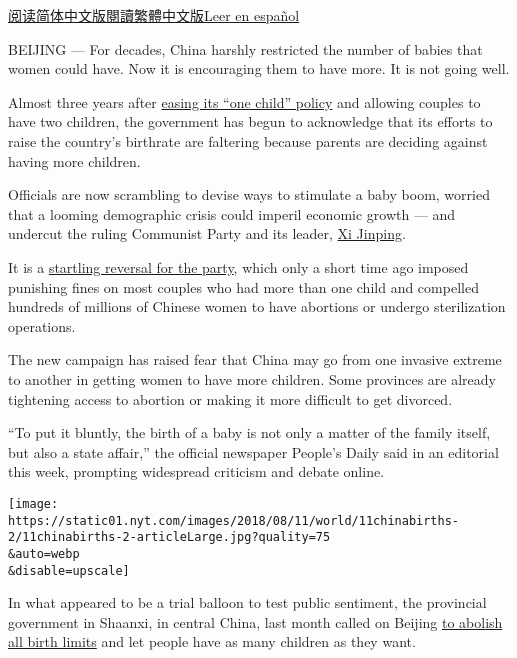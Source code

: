 \href{https://cn.nytimes.com/china/20180813/china-one-child-policy-birthrate/}{阅读简体中文版}\href{https://cn.nytimes.com/china/20180813/china-one-child-policy-birthrate/zh-hant/}{閱讀繁體中文版}\href{https://www.nytimes.com/es/2018/08/16/china-poblacion-hijo-unico/}{Leer
en español}

BEIJING --- For decades, China harshly restricted the number of babies
that women could have. Now it is encouraging them to have more. It is
not going well.

Almost three years after
\href{https://www.nytimes.com/2015/10/30/world/asia/china-end-one-child-policy.html}{easing
its ``one child'' policy} and allowing couples to have two children, the
government has begun to acknowledge that its efforts to raise the
country's birthrate are faltering because parents are deciding against
having more children.

Officials are now scrambling to devise ways to stimulate a baby boom,
worried that a looming demographic crisis could imperil economic growth
--- and undercut the ruling Communist Party and its leader,
\href{https://www.nytimes.com/2018/07/31/world/asia/xi-jinping-internal-dissent.html}{Xi
Jinping}.

It is a
\href{https://www.nytimes.com/interactive/2015/10/29/world/asia/china-one-child-policy-timeline.html}{startling
reversal for the party}, which only a short time ago imposed punishing
fines on most couples who had more than one child and compelled hundreds
of millions of Chinese women to have abortions or undergo sterilization
operations.

The new campaign has raised fear that China may go from one invasive
extreme to another in getting women to have more children. Some
provinces are already tightening access to abortion or making it more
difficult to get divorced.

``To put it bluntly, the birth of a baby is not only a matter of the
family itself, but also a state affair,'' the official newspaper
People's Daily said in an editorial this week, prompting widespread
criticism and debate online.

\texttt{[image: https://static01.nyt.com/images/2018/08/11/world/11chinabirths-2/11chinabirths-2-articleLarge.jpg?quality=75\\\&auto=webp\\\&disable=upscale]}

In what appeared to be a trial balloon to test public sentiment, the
provincial government in Shaanxi, in central China, last month called on
Beijing \href{http://www.globaltimes.cn/content/1111866.shtml}{to
abolish all birth limits} and let people have as many children as they
want.

